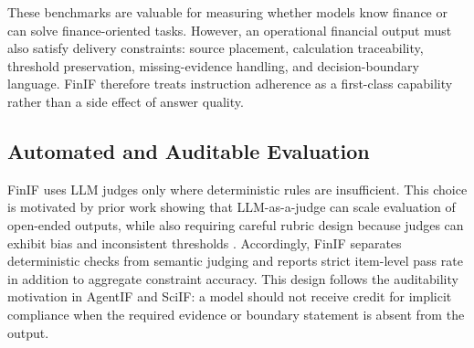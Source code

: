 These benchmarks are valuable for measuring whether models know finance or can solve finance-oriented tasks.
However, an operational financial output must also satisfy delivery constraints: source placement, calculation traceability, threshold preservation, missing-evidence handling, and decision-boundary language.
FinIF therefore treats instruction adherence as a first-class capability rather than a side effect of answer quality.

\subsection{Automated and Auditable Evaluation}

FinIF uses LLM judges only where deterministic rules are insufficient.
This choice is motivated by prior work showing that LLM-as-a-judge can scale evaluation of open-ended outputs, while also requiring careful rubric design because judges can exhibit bias and inconsistent thresholds \citep{liu2023geval,zheng2023mtbench}.
Accordingly, FinIF separates deterministic checks from semantic judging and reports strict item-level pass rate in addition to aggregate constraint accuracy.
This design follows the auditability motivation in AgentIF and SciIF: a model should not receive credit for implicit compliance when the required evidence or boundary statement is absent from the output.
